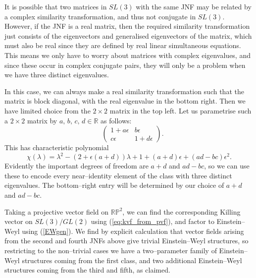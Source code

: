 It is possible that two matrices in $SL(3)$ with the same JNF may be related by a complex similarity transformation, and thus not conjugate in $SL(3)$. However, if the JNF is a real matrix, then the required similarity transformation just consists of the eigenvectors and generalised eigenvectors of the matrix, which must also be real since they are defined by real linear simultaneous equations. This means we only have to worry about matrices with complex eigenvalues, and since these occur in complex conjugate pairs, they will only be a problem when we have three distinct eigenvalues.

In this case, we can always make a real similarity transformation such that the matrix is block diagonal, with the real eigenvalue in the bottom right. Then we have limited choice from the $2\times 2$ matrix in the top left. Let us parametrise such a $2\times 2$ matrix by $a,\,b,\,c,\,d\in\mathbb{R}$ as follows:
\[
\quad
\begin{pmatrix}1+a\epsilon & b\epsilon \\
c\epsilon & 1+d\epsilon 
\end{pmatrix}.
\]
This has characteristic polynomial
\[
\chi(\lambda)=\lambda^2-(2+\epsilon(a+d))\lambda+1+(a+d)\epsilon+(ad-bc)\epsilon^2.
\]
Evidently the important degrees of freedom are $a+d$ and $ad-bc$, so we can use these to encode every near--identity element of the class with three distinct eigenvalues. The bottom--right entry will be determined by our choice of $a+d$ and $ad-bc$.

Taking a projective vector field on $\mathbb{RP}^2$, we can find the corresponding Killing vector on $SL(3)/GL(2)$ using (\ref{eq:kvf_from_pvf}), and factor to Einstein--Weyl using (\ref{EWgen}). We find by explicit calculation that vector fields arising from the second and fourth JNFs above give trivial Einstein--Weyl structures, so restricting to the non--trivial cases we have a two--parameter family of Einstein--Weyl structures coming from the first class, and two additional Einstein--Weyl structures coming from the third and fifth, as claimed.
\koniec


